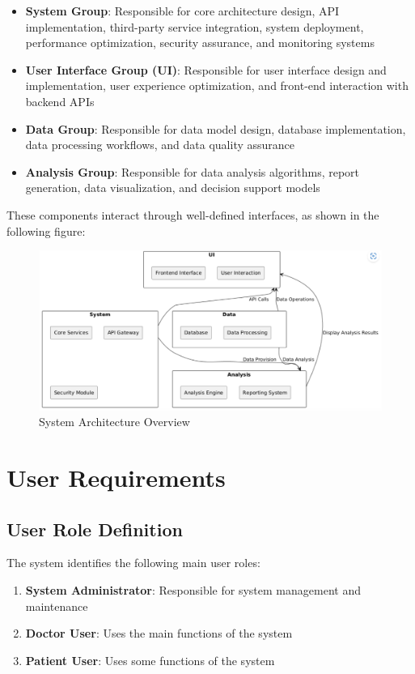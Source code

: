 \documentclass[a4paper,12pt]{article}
\begin{document}
\begin{itemize}
  \item \textbf{System Group}: Responsible for core architecture design, API implementation, third-party service integration, system deployment, performance optimization, security assurance, and monitoring systems
  \item \textbf{User Interface Group (UI)}: Responsible for user interface design and implementation, user experience optimization, and front-end interaction with backend APIs
  \item \textbf{Data Group}: Responsible for data model design, database implementation, data processing workflows, and data quality assurance
  \item \textbf{Analysis Group}: Responsible for data analysis algorithms, report generation, data visualization, and decision support models
\end{itemize}

These components interact through well-defined interfaces, as shown in the following figure:

\begin{figure}[H]
    \centering
    \includegraphics[width=0.75\linewidth]{assets/7_EG.png}
    \caption{System Architecture Overview}
    \label{fig:system-architecture}
\end{figure}

\section{User Requirements}

\subsection{User Role Definition}

The system identifies the following main user roles:

\begin{enumerate}
  \item \textbf{System Administrator}: Responsible for system management and maintenance
  \item \textbf{Doctor User}: Uses the main functions of the system
  \item \textbf{Patient User}: Uses some functions of the system
\end{enumerate}
\end{document}
